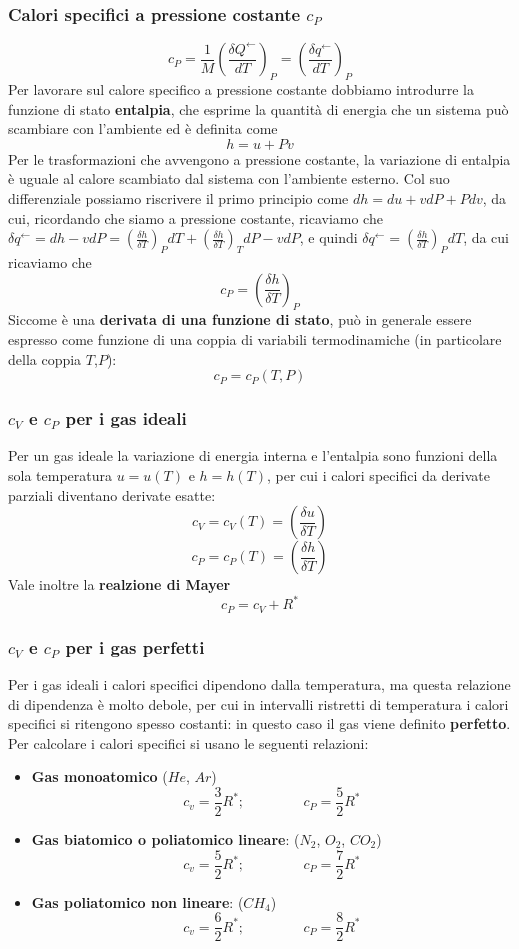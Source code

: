 \subsubsection{Calori specifici a pressione costante $c_P$}
\[
    c_P =\frac{1}{M}\left(\frac{\delta Q^\leftarrow }{dT}\right)_P = \left(\frac{\delta q^\leftarrow }{dT}\right)_P
\]
Per lavorare sul calore specifico a pressione costante dobbiamo introdurre la funzione di stato \textbf{entalpia}, che esprime la quantità di energia che un sistema può scambiare con l'ambiente ed è definita come
\[
    h = u + Pv
\]
Per le trasformazioni che avvengono a pressione costante, la variazione di entalpia è uguale al calore scambiato dal sistema con l'ambiente esterno. Col suo differenziale possiamo riscrivere il primo principio come $dh = du + vdP + Pdv$, da cui, ricordando che siamo a pressione costante, ricaviamo che $\delta q^\leftarrow = dh - vdP = \left(\frac{\delta h}{\delta T}\right)_P dT + \left(\frac{\delta h}{\delta T}\right)_T dP - vdP$, e quindi $\delta q^\leftarrow  =  \left(\frac{\delta h}{\delta T}\right)_P dT$, da cui ricaviamo che
\[
    c_P =  \left(\frac{\delta h}{\delta T}\right)_P
\]
Siccome è una \textbf{derivata di una funzione di stato}, può in generale essere espresso come funzione di una coppia di variabili termodinamiche (in particolare della coppia $T$,$P$): 
\[
    c_P = c_P(T,P)
\]
\subsubsection{$c_V$ e $c_P$ per i gas ideali}
Per un gas ideale la variazione di energia interna e l'entalpia sono funzioni della sola temperatura $u = u(T)$ e $h = h(T)$, per cui i calori specifici da derivate parziali diventano derivate esatte:
\[
    c_V = c_V(T) = \left(\frac{\delta u}{\delta T}\right)
\]
\[
    c_P = c_P(T) = \left( \frac{\delta h}{ \delta T}\right)
\]
Vale inoltre la \textbf{realzione di Mayer}
\[
    c_P = c_V + R^*
\]
\subsubsection{$c_V$ e $c_P$ per i gas perfetti}
Per i gas ideali i calori specifici dipendono dalla temperatura, ma questa relazione di dipendenza è molto debole, per cui in intervalli ristretti di temperatura i calori specifici si ritengono spesso costanti: in questo caso il gas viene definito \textbf{perfetto}.\newline
\newline
Per calcolare i calori specifici si usano le seguenti relazioni:
\begin{itemize}
    \item \textbf{Gas monoatomico} ($He$, $Ar$)
    \[
        c_v = \frac{3}{2}R^*; \;\;\;\;\;\;\;\;\;\;\;\;\;\;\;c_P = \frac{5}{2}R^*
    \]
    \item \textbf{Gas biatomico o poliatomico lineare}: ($N_2$, $O_2$, $CO_2$)
    \[
        c_v = \frac{5}{2}R^*; \;\;\;\;\;\;\;\;\;\;\;\;\;\;\;c_P = \frac{7}{2}R^*
    \]
    \item \textbf{Gas poliatomico non lineare}: ($CH_4$)
    \[
        c_v = \frac{6}{2}R^*; \;\;\;\;\;\;\;\;\;\;\;\;\;\;\;c_P = \frac{8}{2}R^*
    \]
\end{itemize}
